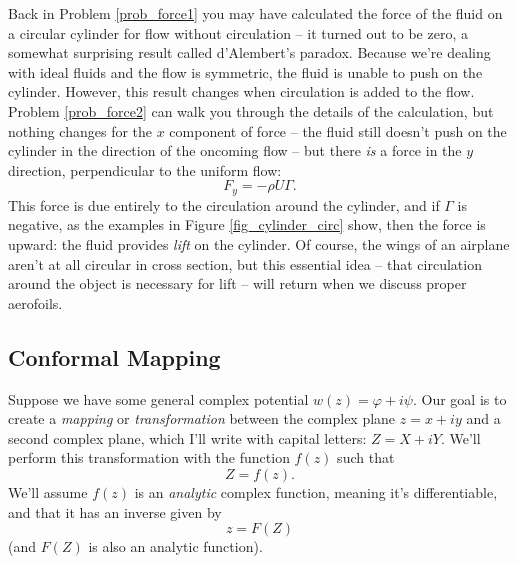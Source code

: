 Back in Problem \ref{prob_force1} you may have calculated the force of the fluid on a circular cylinder for flow without circulation -- it turned out to be zero, a somewhat surprising result called d'Alembert's paradox.  Because we're dealing with ideal fluids and the flow is symmetric, the fluid is unable to push on the cylinder.  However, this result changes when circulation is added to the flow.  Problem \ref{prob_force2} can walk you through the details of the calculation, but nothing changes for the $x$ component of force -- the fluid still doesn't push on the cylinder in the direction of the oncoming flow -- but there \emph{is} a force in the $y$ direction, perpendicular to the uniform flow:
\begin{equation}
\label{eq_force1}
F_y = -\rho U \Gamma.
\end{equation}
This force is due entirely to the circulation around the cylinder, and if $\Gamma$ is negative, as the examples in Figure \ref{fig_cylinder_circ} show, then the force is upward:  the fluid provides \emph{lift} on the cylinder.  Of course, the wings of an airplane aren't at all circular in cross section, but this essential idea -- that circulation around the object is necessary for lift -- will return when we discuss proper aerofoils.




\subsection{Conformal Mapping}

Suppose we have some general complex potential $w(z) = \varphi + i\psi$.  Our goal is to create a \emph{mapping} or \emph{transformation} between the complex plane $z = x+iy$ and a second complex plane, which I'll write with capital letters: $Z = X + iY$.  We'll perform this transformation with the function $f(z)$ such that
\begin{equation}
Z = f(z).
\end{equation}
We'll assume $f(z)$ is an \emph{analytic} complex function, meaning it's differentiable, and that it has an inverse given by
\begin{equation}
z = F(Z)
\end{equation}
(and $F(Z)$ is also an analytic function).

